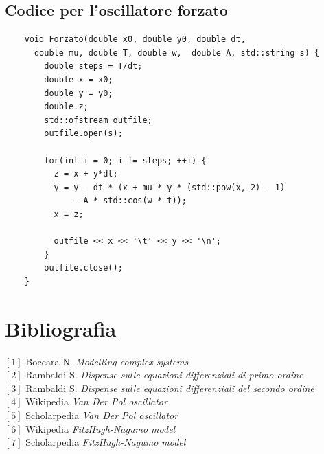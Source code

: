 \documentclass[12pt]{article}
\begin{document}
\subsection{Codice per l'oscillatore forzato}
\begin{lstlisting}
	void Forzato(double x0, double y0, double dt, 
	  double mu, double T, double w,  double A, std::string s) { 
		double steps = T/dt;
		double x = x0;
		double y = y0;
		double z;
		std::ofstream outfile;
		outfile.open(s);
		
		for(int i = 0; i != steps; ++i) {
		  z = x + y*dt;
		  y = y - dt * (x + mu * y * (std::pow(x, 2) - 1) 
		      - A * std::cos(w * t));
		  x = z;
			
		  outfile << x << '\t' << y << '\n';
		}
		outfile.close();
	}
\end{lstlisting}

\section{Bibliografia}
$[1]$ Boccara N. \textit{Modelling complex systems} \\
$[2]$ Rambaldi S. \textit{Dispense sulle equazioni differenziali di primo ordine} \\
$[3]$ Rambaldi S. \textit{Dispense sulle equazioni differenziali del secondo ordine} \\
$[4]$ Wikipedia \textit{Van Der Pol oscillator}\\
$[5]$ Scholarpedia \textit{Van Der Pol oscillator} \\
$[6]$ Wikipedia \textit{FitzHugh-Nagumo model} \\
$[7]$ Scholarpedia \textit{FitzHugh-Nagumo model} 
\end{document}
